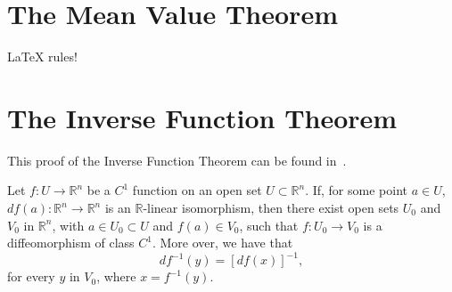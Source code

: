 \section{The Mean Value Theorem}\label{sec:the_mean_value_theorem}

\begin{theorem}\label{thm:the-mean-value-theorem}
  \LaTeX{} rules!
\end{theorem}

\section{The Inverse Function Theorem}\label{sec:the_inverse_function_theorem}

This proof of the Inverse Function Theorem can be found in~\cite{lang2012real}.

\begin{theorem}\label{thm:the-inverse-function-theorem}
  Let \(f:U\to\mathbb{R}^{n}\) be a \(C^{1}\) function on an open set \({U}\subset{\mathbb{R}^{n}}\). If, for some point \({a}\in{U}\), \(df(a):\mathbb{R}^{n}\to\mathbb{R}^{n}\) is an \(\mathbb{R}\)-linear isomorphism, then there exist open sets \(U_{0}\) and \(V_{0}\) in \(\mathbb{R}^{n}\), with \({a}\in{U_{0}}\subset{U}\) and \({f(a)}\in{V_{0}}\), such that \(f:U_{0}\to{V_{0}}\) is a diffeomorphism of class \(C^{1}\). More over, we have that
  \[
    df^{-1}(y)=[df(x)]^{-1},
  \]
  for every \(y\) in \(V_{0}\), where \(x=f^{-1}(y)\).
\end{theorem}

